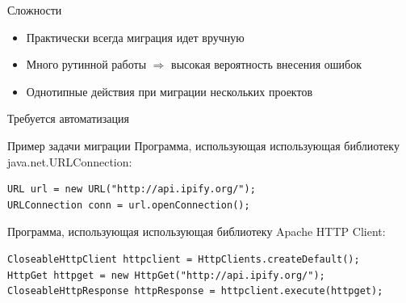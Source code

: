 \documentclass[12pt]{beamer}
\begin{document}
{
\begin{frame}{Сложности}
\begin{mybox}[]
\begin{itemize}
	\item Практически всегда миграция идет вручную
	\item Много рутинной работы $\Longrightarrow$ высокая вероятность внесения ошибок
	\item Однотипные действия при миграции нескольких проектов
\end{itemize}
\end{mybox}
\vspace{0.5cm}
\begin{mybox}[]
\begin{center}
    Требуется автоматизация
\end{center}
\end{mybox}
\end{frame}
}

\begin{frame}[fragile]{Пример задачи миграции}
	Программа, использующая использующая библиотеку java.net.URLConnection:
\begin{verbatim}
URL url = new URL("http://api.ipify.org/");
URLConnection conn = url.openConnection();
\end{verbatim}
	Программа, использующая использующая библиотеку Apache HTTP Client:
\begin{verbatim}
CloseableHttpClient httpclient = HttpClients.createDefault();
HttpGet httpget = new HttpGet("http://api.ipify.org/");
CloseableHttpResponse httpResponse = httpclient.execute(httpget);
\end{verbatim}
\end{frame}
\end{document}
